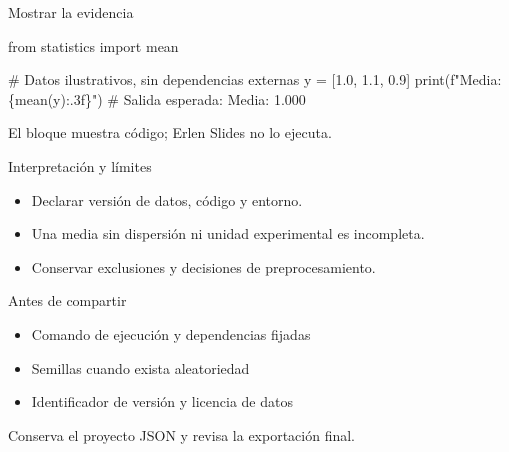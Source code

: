 \documentclass[aspectratio=169,11pt]{beamer}
\begin{document}
\begin{frame}[fragile]{Mostrar la evidencia}
  \transdissolve[duration=0.25]
  \begin{semiverbatim}
  from statistics import mean
  
  # Datos ilustrativos, sin dependencias externas
  y = [1.0, 1.1, 0.9]
  print(f"Media: \{mean(y):.3f\}")
  # Salida esperada: Media: 1.000
  \end{semiverbatim}
  \medskip

  {\small El bloque muestra código; Erlen Slides no lo ejecuta.}
\end{frame}

\begin{frame}{Interpretación y límites}
  \transdissolve[duration=0.25]
  \begin{itemize}
    \item Declarar versión de datos, código y entorno.
    \item Una media sin dispersión ni unidad experimental es incompleta.
    \item Conservar exclusiones y decisiones de preprocesamiento.
  \end{itemize}
\end{frame}

\begin{frame}{Antes de compartir}
  \transdissolve[duration=0.25]
  \begin{itemize}
    \item Comando de ejecución y dependencias fijadas
    \item Semillas cuando exista aleatoriedad
    \item Identificador de versión y licencia de datos
  \end{itemize}
  \medskip

  {\small Conserva el proyecto JSON y revisa la exportación final.}
\end{frame}
\end{document}
